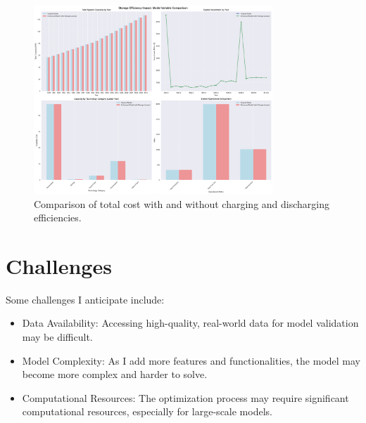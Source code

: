 \documentclass[11pt]{article}
\begin{document}
\begin{figure}[H]
    \centering
    \includegraphics[width=0.8\textwidth]{storage_comparison_output/storage_efficiency_impact_analysis.png}
    \caption{Comparison of total cost with and without charging and discharging efficiencies.}
    \label{fig:efficiency_total_cost}
\end{figure}


\section{Challenges}
Some challenges I anticipate include:
\begin{itemize}
    \item Data Availability: Accessing high-quality, real-world data for model validation may be difficult.
    \item Model Complexity: As I add more features and functionalities, the model may become more complex and harder to solve.
    \item Computational Resources: The optimization process may require significant computational resources, especially for large-scale models.
\end{itemize}




\end{document}
